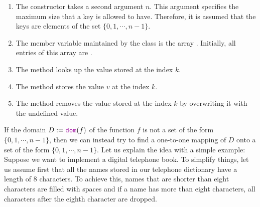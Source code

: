 \begin{enumerate}
\item The constructor takes a second argument $n$.  This argument specifies the
      maximum size that a key is allowed to have.  Therefore, it is assumed that
      the keys are elements of the set $\{0,1, \cdots, n-1\}$.
\item The member variable maintained by the class  is the array .
      Initially, all entries of this array are .
\item The method  looks up the value stored at the index $k$.
\item The method  stores the value $v$ at the index $k$.
\item The method  removes the value stored at the index $k$ by overwriting it with the undefined
      value. 
\end{enumerate}
If the domain $D := \mytt{dom}(f)$ of the function $f$ is not a set of the form $\{0,1, \cdots, n-1\}$, 
then we can instead try to find a one-to-one mapping of $D$ onto a set of the form $\{0,1,\cdots,n-1\}$.
Let us explain the idea with a simple example:  Suppose we want to implement a digital
telephone book.
To simplify things, let us assume first that all the names stored in our telephone dictionary
have a length of 8 characters.  To achieve this, names that are shorter than eight characters
are filled with spaces and if a name has more than eight characters, all characters after the
eighth character are dropped.


